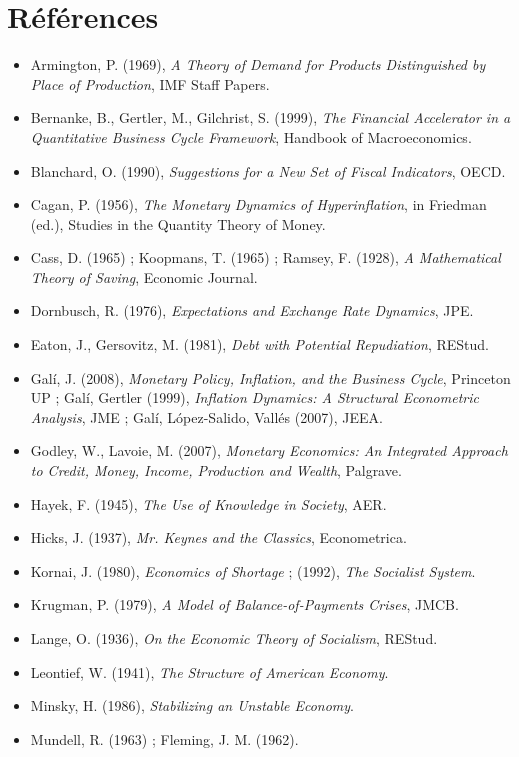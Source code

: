 \documentclass[11pt,a4paper]{article}
\begin{document}
\section*{Références}
\begin{itemize}\small
\item Armington, P. (1969), \emph{A Theory of Demand for Products Distinguished by Place of Production}, IMF Staff Papers.
\item Bernanke, B., Gertler, M., Gilchrist, S. (1999), \emph{The Financial Accelerator in a Quantitative Business Cycle Framework}, Handbook of Macroeconomics.
\item Blanchard, O. (1990), \emph{Suggestions for a New Set of Fiscal Indicators}, OECD.
\item Cagan, P. (1956), \emph{The Monetary Dynamics of Hyperinflation}, in Friedman (ed.), Studies in the Quantity Theory of Money.
\item Cass, D. (1965) ; Koopmans, T. (1965) ; Ramsey, F. (1928), \emph{A Mathematical Theory of Saving}, Economic Journal.
\item Dornbusch, R. (1976), \emph{Expectations and Exchange Rate Dynamics}, JPE.
\item Eaton, J., Gersovitz, M. (1981), \emph{Debt with Potential Repudiation}, REStud.
\item Galí, J. (2008), \emph{Monetary Policy, Inflation, and the Business Cycle}, Princeton UP ; Galí, Gertler (1999), \emph{Inflation Dynamics: A Structural Econometric Analysis}, JME ; Galí, López-Salido, Vallés (2007), JEEA.
\item Godley, W., Lavoie, M. (2007), \emph{Monetary Economics: An Integrated Approach to Credit, Money, Income, Production and Wealth}, Palgrave.
\item Hayek, F. (1945), \emph{The Use of Knowledge in Society}, AER.
\item Hicks, J. (1937), \emph{Mr. Keynes and the Classics}, Econometrica.
\item Kornai, J. (1980), \emph{Economics of Shortage} ; (1992), \emph{The Socialist System}.
\item Krugman, P. (1979), \emph{A Model of Balance-of-Payments Crises}, JMCB.
\item Lange, O. (1936), \emph{On the Economic Theory of Socialism}, REStud.
\item Leontief, W. (1941), \emph{The Structure of American Economy}.
\item Minsky, H. (1986), \emph{Stabilizing an Unstable Economy}.
\item Mundell, R. (1963) ; Fleming, J. M. (1962).

\end{itemize}
\end{document}
